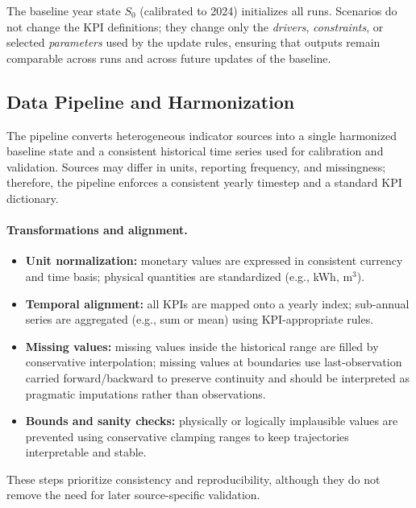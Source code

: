 \documentclass{article}
\begin{document}
The baseline year state $S_0$ (calibrated to 2024) initializes all runs.
Scenarios do not change the KPI definitions; they change only the
\textit{drivers}, \textit{constraints}, or selected \textit{parameters} used
by the update rules, ensuring that outputs remain comparable across runs and
across future updates of the baseline.

\subsection{Data Pipeline and Harmonization}
\label{subsec:data_pipeline}

The pipeline converts heterogeneous indicator sources into a single harmonized
baseline state and a consistent historical time series used for calibration and
validation. Sources may differ in units, reporting frequency, and missingness;
therefore, the pipeline enforces a consistent yearly timestep and a standard
KPI dictionary.

\paragraph{Transformations and alignment.}
\begin{itemize}
    \item \textbf{Unit normalization:} monetary values are expressed in
          consistent currency and time basis; physical quantities are
          standardized (e.g., kWh, m$^3$).
    \item \textbf{Temporal alignment:} all KPIs are mapped onto a yearly index;
          sub-annual series are aggregated (e.g., sum or mean) using
          KPI-appropriate rules.
    \item \textbf{Missing values:} missing values inside the historical range
          are filled by conservative interpolation; missing values at boundaries
          use last-observation carried forward/backward to preserve continuity
          and should be interpreted as pragmatic imputations rather than
          observations.
    \item \textbf{Bounds and sanity checks:} physically or logically implausible
          values are prevented using conservative clamping ranges to keep
          trajectories interpretable and stable.
\end{itemize}

These steps prioritize consistency and reproducibility, although they do not
remove the need for later source-specific validation.
\end{document}
